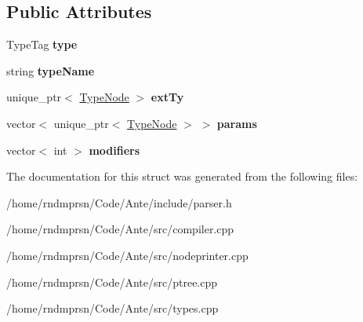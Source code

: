 \subsection*{Public Attributes}
\begin{DoxyCompactItemize}
\item 
\mbox{\label{structTypeNode_a63723cb9aebf870f328c360aa015bb32}} 
Type\+Tag {\bfseries type}
\item 
\mbox{\label{structTypeNode_a5aadfc959bd39a49a470ac01c7770486}} 
string {\bfseries type\+Name}
\item 
\mbox{\label{structTypeNode_a79372c9b9f5f2d95591b763a27f13379}} 
unique\+\_\+ptr$<$ \hyperlink{structTypeNode}{Type\+Node} $>$ {\bfseries ext\+Ty}
\item 
\mbox{\label{structTypeNode_ad59d8bdd4e281ca0d42473fb005d371d}} 
vector$<$ unique\+\_\+ptr$<$ \hyperlink{structTypeNode}{Type\+Node} $>$ $>$ {\bfseries params}
\item 
\mbox{\label{structTypeNode_adbb221a51767aa2c655ee89a6700d01d}} 
vector$<$ int $>$ {\bfseries modifiers}
\end{DoxyCompactItemize}


The documentation for this struct was generated from the following files\+:\begin{DoxyCompactItemize}
\item 
/home/rndmprsn/\+Code/\+Ante/include/parser.\+h\item 
/home/rndmprsn/\+Code/\+Ante/src/compiler.\+cpp\item 
/home/rndmprsn/\+Code/\+Ante/src/nodeprinter.\+cpp\item 
/home/rndmprsn/\+Code/\+Ante/src/ptree.\+cpp\item 
/home/rndmprsn/\+Code/\+Ante/src/types.\+cpp\end{DoxyCompactItemize}
